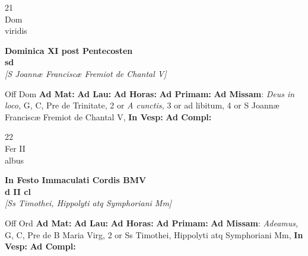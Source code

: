\documentclass[10pt, openany]{book}
\begin{document}
    \begin{center}
        \begin{minipage}{3.5in}
            \vspace{2em}
            \begin{minipage}{0.5in}
                {\Huge 21} \\
                {\normalsize Dom} \\
                {\normalsize viridis}
            \end{minipage}
            \begin{minipage}{3.0in}
                \textbf{ \large Dominica XI post Pentecosten \\
                \textnormal{\normalsize sd}} \\ \textit{[S Joannæ Franciscæ Fremiot de Chantal V]} \\ 
            \end{minipage}
            \begin{justify}Off Dom
                \textbf{Ad Mat: }
                \textbf{Ad Lau: }
                \textbf{Ad Horas: }
                \textbf{Ad Primam: }\textbf{Ad Missam}: \textit{Deus in loco,} G, C, Pre de Trinitate, 2 or \textit{A cunctis,} 3 or ad libitum, 4 or S Joannæ Franciscæ Fremiot de Chantal V,  
                \textbf{In Vesp: }
                \textbf{Ad Compl: }
            \end{justify}
        \end{minipage}
    \end{center}

    \begin{center}
        \begin{minipage}{3.5in}
            \vspace{2em}
            \begin{minipage}{0.5in}
                {\Huge 22} \\
                {\normalsize Fer II} \\
                {\normalsize albus}
            \end{minipage}
            \begin{minipage}{3.0in}
                \textbf{ \large In Festo Immaculati Cordis BMV \\
                \textnormal{\normalsize d II cl}} \\ \textit{[Ss Timothei, Hippolyti atq Symphoriani Mm]} \\ 
            \end{minipage}
            \begin{justify}Off Ord
                \textbf{Ad Mat: }
                \textbf{Ad Lau: }
                \textbf{Ad Horas: }
                \textbf{Ad Primam: }\textbf{Ad Missam}: \textit{Adeamus,} G, C, Pre de B Maria Virg, 2 or Ss Timothei, Hippolyti atq Symphoriani Mm,  
                \textbf{In Vesp: }
                \textbf{Ad Compl: }
            \end{justify}
        \end{minipage}
    \end{center}
\end{document}

